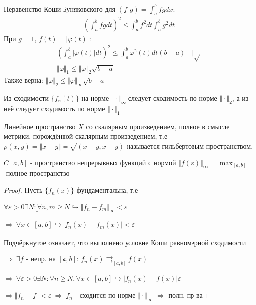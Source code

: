 \documentclass{article}
\theoremstyle{definition}
\numberwithin{theorem}{section}
\numberwithin{lemma}{section}
\numberwithin{definition}{section}
\numberwithin{corollary}{section}
\numberwithin{equation}{section}
\let\phi\varphi
\let\epsilon\varepsilon
\let\implies\Rightarrow
\let\true\hookrightarrow
\begin{document}
Неравенство Коши-Буняковского для $(f,g)=\int_{a}^{b}fgdx$:
\begin{gather*}
  \left( \int_{a}^{b}fgdt\right)^{2}\le \int_{a}^{b}f^{2}dt\int_{a}^{b}g^{2}dt
\end{gather*}
При $g=1$, $f(t)=|\phi(t)|$:
\begin{gather*}
  \left(\int_{a}^{b}|\phi(t)|dt\right)^{2} \le \int_{a}^{b}\phi^{2}(t)dt (b-a) \quad \Big|\sqrt{} \\
  \Vert \phi \Vert_1 \le \Vert \phi \Vert_{2}\sqrt{b-a}
\end{gather*}
Также верна: $\Vert \phi \Vert_{2}\le \Vert \phi \Vert_{\infty}\sqrt{b-a}$
 
\begin{theorem}
  Из сходимости $\{f_n(t)\}$ на норме $\Vert \cdot \Vert_{\infty}$ следует сходимость
  по норме $\Vert \cdot \Vert_{2}$, а из неё следует сходимость по норме $\Vert \cdot \Vert_{1}$
\end{theorem}
\begin{definition}
  Линейное пространство $X$ со скалярным произведением, полное в смысле метрики,
  порождённой скалярным произведением, т.е $\rho(x,y)=\Vert x-y \Vert=\sqrt{(x-y,x-y)}$ 
  называется гильбертовым пространством.
\end{definition}
\begin{theorem}
  $C[a,b]$ - пространство непрерывных функций с нормой $\Vert f(x) \Vert_{\infty}=\max_{[a,b]}$
  -полное пространство
\end{theorem}
\begin{proof}
Пусть $\{f_{n}(x)\}$ фундаментальна, т.е 

$\underline{\forall \epsilon > 0 \exists N: \forall n,m \ge N} \true \Vert f_n-f_m \Vert_{\infty}< \epsilon$

$\implies \ \underline{\forall x \in [a,b] \true |f_n(x)-f_m(x)|<\epsilon}$

Подчёркнутое означает, что выполнено условие Коши равномерной сходимости

$\implies \ \exists f$ - непр. на $[a,b]$: $f_n(x) \rightrightarrows_{[a,b]}f(x)$

$\implies \ \underline{\forall \epsilon > 0 \exists N: \forall n\ge N}, \forall x \in [a,b] \true |f_n(x)-f(x)| \epsilon$

$\implies \underline{\Vert f_n-f \Vert<\epsilon} \ \implies$ $f_n$ - сходится
по норме $\Vert \cdot \Vert_{\infty}$ $\implies$ полн. пр-ва
\end{proof}

\end{document}
